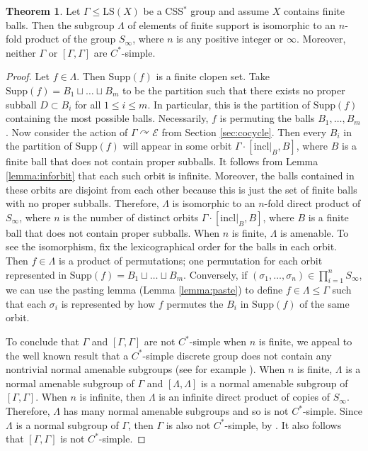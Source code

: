 \documentclass[12pt]{amsart}
\numberwithin{equation}{subsection}
\theoremstyle{definition}
\newtheorem{theorem}{Theorem}[section]
\theoremstyle{definition}
\theoremstyle{remark}
\newcommand{\supp}{\text{Supp}}
\begin{document}
\begin{theorem}\label{thm:amenSubgroup}
    Let $\Gamma \leq \text{LS}(X)$ be a CSS$^*$ group and assume $X$ contains finite balls. Then the subgroup $\Lambda$ of elements of finite support is isomorphic to an $n$-fold product of the group $S_\infty$, where $n$ is any positive integer or $\infty$. Moreover, neither $\Gamma$ or $[\Gamma,\Gamma]$ are $C^*$-simple. 
\end{theorem}
\begin{proof}
    Let $f \in \Lambda$. Then $\supp(f)$ is a finite clopen set. Take $\supp(f) = B_1 \sqcup \dots \sqcup B_m$ to be the partition such that there exists no proper subball $D \subset B_i$ for all $1 \leq i \leq m$. In particular, this is the partition of $\supp(f)$ containing the most possible balls. Necessarily, $f$ is permuting the balls $B_1, \dots, B_m$. Now consider the action of $\Gamma \curvearrowright \mathcal E$ from Section \ref{sec:cocycle}. Then every $B_i$ in the partition of $\supp(f)$ will appear in some orbit $\Gamma \cdot [\text{incl}\vert_B,B]$, where $B$ is a finite ball that does not contain proper subballs. It follows from Lemma \ref{lemma:inforbit} that each such orbit is infinite. Moreover, the balls contained in these orbits are disjoint from each other because this is just the set of finite balls with no proper subballs. Therefore, $\Lambda$ is isomorphic to an $n$-fold direct product of $S_\infty$, where $n$ is the number of distinct orbits $\Gamma \cdot [\text{incl}\vert_B,B]$, where $B$ is a finite ball that does not contain proper subballs. When $n$ is finite, $\Lambda$ is amenable. To see the isomorphism, fix the lexicographical order for the balls in each orbit. Then $f \in \Lambda$ is a product of permutations; one permutation for each orbit represented in $\supp(f) = B_1 \sqcup \dots \sqcup B_m$. Conversely, if $(\sigma_1,\dots, \sigma_n) \in \prod_{i=1}^nS_\infty$, we can use the pasting lemma (Lemma \ref{lemma:paste}) to define $f \in \Lambda \leq \Gamma$ such that each $\sigma_i$ is represented by how $f$ permutes the $B_i$ in $\supp(f)$ of the same orbit. 

    To conclude that $\Gamma$ and $[\Gamma, \Gamma]$ are not $C^*$-simple when $n$ is finite, we appeal to the well known result that a $C^*$-simple discrete group does not contain any nontrivial normal amenable subgroups (see for example \cite[Proposition 3]{delaHarpeSimpleC*2007}). When $n$ is finite, $\Lambda$ is a normal amenable subgroup of $\Gamma$ and $[\Lambda, \Lambda]$ is a normal amenable subgroup of $[\Gamma, \Gamma]$. When $n$ is infinite, then $\Lambda$ is an infinite direct product of copies of $S_\infty$. Therefore, $\Lambda$ has many normal amenable subgroups and so is not $C^*$-simple. Since $\Lambda$ is a normal subgroup of $\Gamma$, then $\Gamma$ is also not $C^*$-simple, by \cite[Theorem 1.4]{BKKO2016UniqueTraceProp}. It also follows that $[\Gamma, \Gamma]$ is not $C^*$-simple. 

 
\end{proof}
\end{document}
